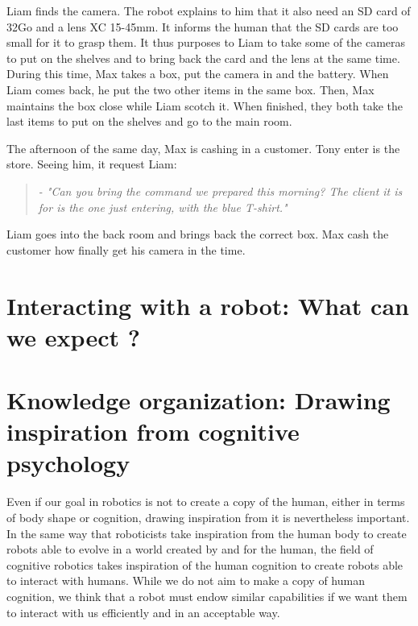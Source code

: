Liam finds the camera. The robot explains to him that it also need an SD card of 32Go and a lens XC 15-45mm. It informs the human that the SD cards are too small for it to grasp them. It thus purposes to Liam to take some of the cameras to put on the shelves and to bring back the card and the lens at the same time. During this time, Max takes a box, put the camera in and the battery. When Liam comes back, he put the two other items in the same box. Then, Max maintains the box close while Liam scotch it. When finished, they both take the last items to put on the shelves and go to the main room.

The afternoon of the same day, Max is cashing in a customer. Tony enter is the store. Seeing him, it request Liam:

\begin{quote} 
\centering 
\textit{
- "Can you bring the command we prepared this morning? The client it is for is the one just entering, with the blue T-shirt."}
\end{quote}

Liam goes into the back room and brings back the correct box. Max cash the customer how finally get his camera in the time.

\section{Interacting with a robot: What can we expect ?}

\section[Knowledge organization]{Knowledge organization: Drawing inspiration from cognitive psychology }

Even if our goal in robotics is not to create a copy of the human, either in terms of body shape or cognition, drawing inspiration from it is nevertheless important. In the same way that roboticists take inspiration from the human body to create robots able to evolve in a world created by and for the human, the field of cognitive robotics takes inspiration of the human cognition to create robots able to interact with humans. While we do not aim to make a copy of human cognition, we think that a robot must endow similar capabilities if we want them to interact with us efficiently and in an acceptable way.

